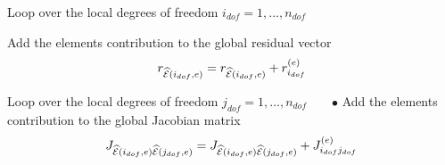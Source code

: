 \begin{DoxyItemize}
\begin{DoxyItemize}
\item Loop over the local degrees of freedom $ i_{dof}=1,...,n_{dof} $
\begin{DoxyItemize}
\item Add the element\textquotesingle{}s contribution to the global residual vector \[ r_{\widehat{\cal E}(i_{dof},e)} = r_{\widehat{\cal E}(i_{dof},e)} + r_{i_{dof}}^{(e)} \]
\begin{DoxyItemize}
\item Loop over the local degrees of freedom $ j_{dof}=1,...,n_{dof}$ ~\newline
~\newline
 $ \bullet $ Add the element\textquotesingle{}s contribution to the global Jacobian matrix \[ J_{\widehat{\cal E}(i_{dof},e)\widehat{\cal E}(j_{dof},e) } = J_{\widehat{\cal E}(i_{dof},e)\widehat{\cal E}(j_{dof},e) } + J_{i_{dof} j_{dof}}^{(e)} \]
\end{DoxyItemize}
\end{DoxyItemize}
\end{DoxyItemize}
\end{DoxyItemize}

